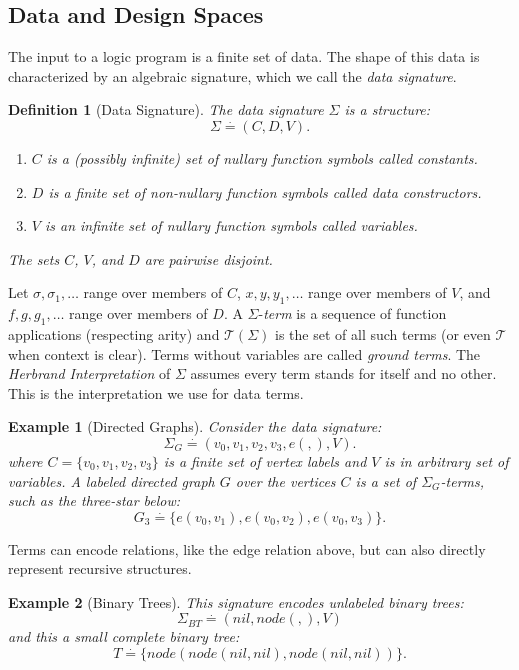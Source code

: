 \documentclass[conference]{IEEEtran}
\newtheorem{defn}{Definition}
\newtheorem{exmp}{Example}[section]
\newcommand{\DefinedToBe}{\stackrel{\mathit{\cdot}}{=}}
\newcommand{\terms}[1]{\mathcal{T}(#1)}
\newcommand{\tclear}{\mathcal{T}}
\begin{document}
\subsection{Data and Design Spaces}
The input to a logic program is a finite set of data. The shape of this data is characterized by an algebraic signature, which we call the \textit{data signature}.
\begin{defn}[Data Signature] The data signature $\Sigma$ is a structure:
\begin{equation}
\Sigma \DefinedToBe ( C, D, V ).
\end{equation}
\begin{enumerate}
\item $C$ is a (possibly infinite) set of nullary function symbols called constants.
\item $D$ is a finite set of non-nullary function symbols called data constructors.
\item $V$ is an infinite set of nullary function symbols called variables.
\end{enumerate}
The sets $C$, $V$, and $D$ are pairwise disjoint.
\end{defn}
Let $\sigma,\sigma_1,\ldots$ range over members of $C$, $x,y,y_1,\ldots$ range over members of $V$, and $f,g,g_1,\ldots$ range over members of $D$. A $\Sigma$-\textit{term} is a sequence of function applications (respecting arity) and $\terms{\Sigma}$ is the set of all such terms (or even $\tclear$ when context is clear). Terms without variables are called \textit{ground terms}. The \textit{Herbrand Interpretation} of $\Sigma$ assumes every term stands for itself and no other. This is the interpretation we use for data terms. 

\begin{exmp}[Directed Graphs] Consider the data signature:
\begin{displaymath}
\Sigma_G \DefinedToBe (v_0,v_1,v_2, v_3, e(,), V).
\end{displaymath}
where $C = \{v_0,v_1,v_2, v_3 \}$ is a finite set of vertex labels and $V$ is in arbitrary set of variables. A labeled directed graph $G$ over the vertices $C$ is a set of $\Sigma_G$-terms, such as the three-star below:
\begin{displaymath}
G_3 \DefinedToBe \{ e(v_0,v_1), e(v_0,v_2), e(v_0,v_3) \}.
\end{displaymath}
\end{exmp}
\noindent Terms can encode relations, like the edge relation above, but can also directly represent recursive structures.
\begin{exmp}[Binary Trees] This signature encodes unlabeled binary trees:
\begin{displaymath}
\Sigma_{BT} \DefinedToBe (nil, node(,), V)
\end{displaymath}
and this a small complete binary tree:
\begin{displaymath}
T \DefinedToBe \{ node(node(nil,nil),node(nil,nil)) \}.
\end{displaymath}
\end{exmp}
\end{document}
